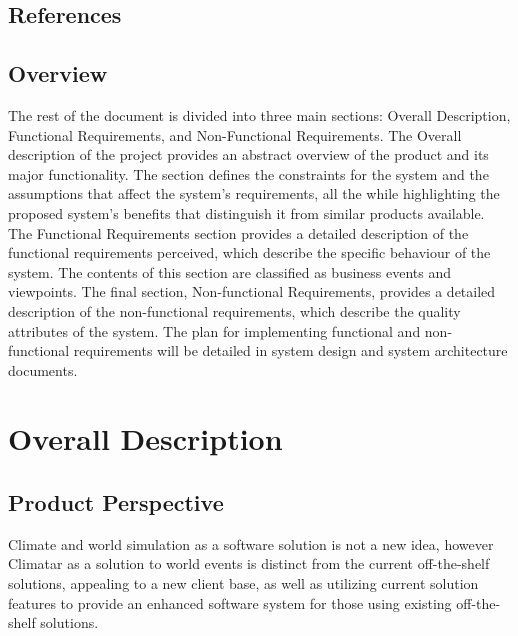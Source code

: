 \documentclass[]{article}
\begin{document}
\subsection{References}
\label{sub:references}



\subsection{Overview}
\label{sub:overview}
	The rest of the document is divided into three main sections: Overall Description, Functional Requirements, and Non-Functional Requirements. The Overall description of the project provides an abstract overview of the product and its major functionality. The section defines the constraints for the system and the assumptions that affect the system's requirements, all the while highlighting the proposed system's benefits that distinguish it from similar products available. The Functional Requirements section provides a detailed description of the functional requirements perceived, which describe the specific behaviour of the system. The contents of this section are classified as business events and viewpoints. The final section, Non-functional Requirements, provides a detailed description of the non-functional requirements, which describe the quality attributes of the system. The plan for implementing functional and non-functional requirements will be detailed in system design and system architecture documents. 


\section{Overall Description}
\label{sec:overall_description}
\subsection{Product Perspective}
\label{sub:product_perspective}

Climate and world simulation as a software solution is not a new idea, however Climatar as a solution to world events is distinct from the current off-the-shelf solutions, appealing to a new client base, as well as utilizing current solution features to provide an enhanced software system for those using existing off-the-shelf solutions.
\end{document}
